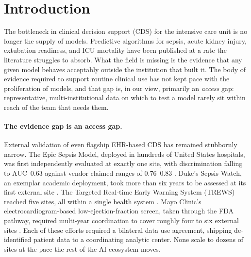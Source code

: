 \section{Introduction}

The bottleneck in clinical decision support (CDS) for the intensive
care unit is no longer the supply of models. Predictive algorithms for
sepsis, acute kidney injury, extubation readiness, and ICU mortality
have been published at a rate the literature struggles to absorb. What
the field is missing is the evidence that any given model behaves
acceptably outside the institution that built it. The body of evidence
required to support routine clinical use has not kept pace with the
proliferation of models, and that gap is, in our view, primarily an
\emph{access} gap: representative, multi-institutional data on which
to test a model rarely sit within reach of the team that needs them.

\paragraph{The evidence gap is an access gap.}
External validation of even flagship EHR-based CDS has remained
stubbornly narrow. The Epic Sepsis Model, deployed in hundreds of
United States hospitals, was first independently evaluated at exactly
one site, with discrimination falling to AUC~0.63 against vendor-claimed
ranges of 0.76--0.83 \citep{wong2021external,habib2021jamaeditorial}.
Duke's Sepsis Watch, an exemplar academic deployment, took more than
six years to be assessed at its first external site
\citep{sendak2025sepsiswatchportability}. The Targeted Real-time Early
Warning System (TREWS) reached five sites, all within a single health
system \citep{adams2022trews}. Mayo Clinic's electrocardiogram-based
low-ejection-fraction screen, taken through the FDA pathway, required
multi-year coordination to cover roughly four to six external sites
\citep{carter2025mayoecgai}. Each of these efforts required a bilateral
data use agreement, shipping de-identified patient data to a
coordinating analytic center. None scale to dozens of sites at the pace
the rest of the AI ecosystem moves.

